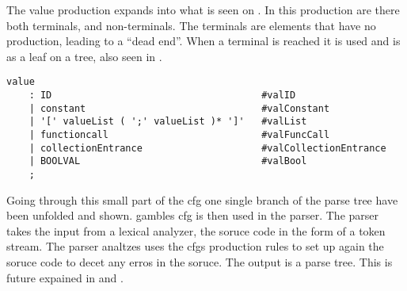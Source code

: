 The value production expands into what is seen on .
In this production are there both terminals, and non-terminals.
The terminals are elements that have no production, leading to a ``dead end''.
When a terminal is reached it is used and is as a leaf on a tree, also seen in .
\begin{lstlisting}[caption={\acrshort{cfg} Value},frame=tlrb,label={lst:value},numbers=none]
value
    : ID                                     #valID
    | constant                               #valConstant
    | '[' valueList ( ';' valueList )* ']'   #valList
    | functioncall                           #valFuncCall
    | collectionEntrance                     #valCollectionEntrance
    | BOOLVAL                                #valBool
    ;
\end{lstlisting}

Going through this small part of the \acrshort{cfg} one single branch of the parse tree have been unfolded and shown.
\gls{gamble}s \acrshort{cfg} is then used in the parser.
The parser takes the input from a lexical analyzer, the soruce code in the form of a token stream.
The parser analtzes uses the \acrshort{cfg}s production rules to set up again the soruce code to decet any erros in the soruce.
The output is a parse tree.
This is future expained in  and .